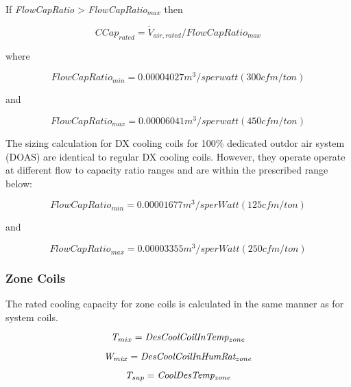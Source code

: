 If \emph{FlowCapRatio} \textgreater{} \emph{FlowCapRatio\(_{max}\)} then

\begin{equation}
CCap_{rated} = \dot V_{air,rated}/FlowCapRatio_{max}
\end{equation}

where

\begin{equation}
FlowCapRatio_{min} = 0.00004027 m^{3}/s per watt (300 cfm/ton)
\end{equation}

and

\begin{equation}
FlowCapRatio_{max} = 0.00006041 m^{3}/s per watt (450 cfm/ton)
\end{equation}

The sizing calculation for DX cooling coils for 100\% dedicated outdor air system (DOAS) are identical to regular DX cooling coils. However, they operate operate at different flow to capacity ratio ranges and are within the prescribed range below:

\begin{equation}
FlowCapRatio_{min} = 0.00001677 m^{3}/s per Watt (125 cfm/ton)
\end{equation}

and

\begin{equation}
FlowCapRatio_{max} = 0.00003355 m^{3}/s per Watt (250 cfm/ton)
\end{equation}

\subsubsection{Zone Coils}\label{zone-coils-5}

The rated cooling capacity for zone coils is calculated in the same manner as for system coils.

\begin{equation}
\emph{T\(_{mix}\)} = \emph{DesCoolCoilInTemp\(_{zone}\)}
\end{equation}

\begin{equation}
\emph{W\(_{mix}\)} = \emph{DesCoolCoilInHumRat\(_{zone}\)}
\end{equation}

\begin{equation}
\emph{T\(_{sup}\)} = \emph{CoolDesTemp\(_{zone}\)}
\end{equation}

